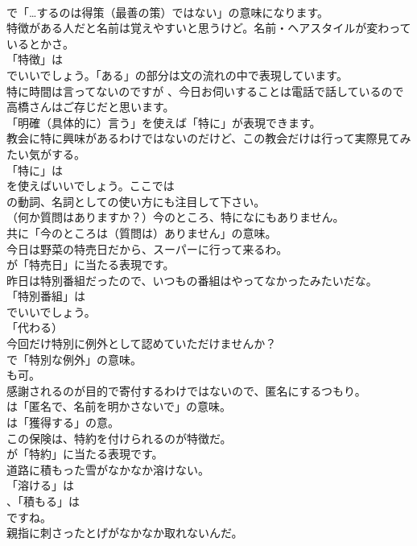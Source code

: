 \documentclass[8pt]{extreport}
\begin{document}
\begin{CJK}{UTF8}{min}
\\	で「…するのは得策（最善の策）ではない」の意味になります。	
\\	特徴がある人だと名前は覚えやすいと思うけど。名前・ヘアスタイルが変わっているとかさ。 
\\	「特徴」は
\\	でいいでしょう。「ある」の部分は文の流れの中で表現しています。	
\\	特に時間は言ってないのですが 、今日お伺いすることは電話で話しているので高橋さんはご存じだと思います。 
\\	「明確（具体的に）言う」を使えば「特に」が表現できます。	
\\	教会に特に興味があるわけではないのだけど、この教会だけは行って実際見てみたい気がする。 
\\	「特に」は
\\	を使えばいいでしょう。ここでは
\\	の動詞、名詞としての使い方にも注目して下さい。	
\\	（何か質問はありますか？）今のところ、特になにもありません。 
\\	共に「今のところは（質問は）ありません」の意味。	
\\	今日は野菜の特売日だから、スーパーに行って来るわ。 
\\	が「特売日」に当たる表現です。	
\\	昨日は特別番組だったので、いつもの番組はやってなかったみたいだな。 
\\	「特別番組」は
\\	でいいでしょう。
\\	「代わる）	
\\	今回だけ特別に例外として認めていただけませんか？ 
\\	で「特別な例外」の意味。
\\	も可。	
\\	感謝されるのが目的で寄付するわけではないので、匿名にするつもり。 
\\	は「匿名で、名前を明かさないで」の意味。
\\	は「獲得する」の意。	
\\	この保険は、特約を付けられるのが特徴だ。 
\\	が「特約」に当たる表現です。	
\\	道路に積もった雪がなかなか溶けない。 
\\	「溶ける」は
\\	、「積もる」は
\\	ですね。	
\\	親指に刺さったとげがなかなか取れないんだ。 

\end{CJK}
\end{document}

